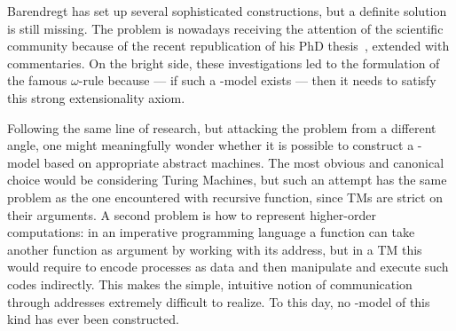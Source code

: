 Barendregt has set up several sophisticated constructions, but a definite solution is still missing.
The problem is nowadays receiving the attention of the scientific community because of the recent republication of his PhD thesis~\cite{BarendregtTh}, extended with commentaries.
On the bright side, these investigations led to the formulation of the famous $\omega$-rule because --- if such a \lam-model exists --- then it needs to satisfy this strong extensionality axiom.

Following the same line of research, but attacking the problem from a different angle, one might meaningfully wonder whether it is possible to construct a \lam-model based on appropriate abstract machines. The most obvious and canonical choice would be considering Turing Machines, but such an attempt has the same problem as the one encountered with recursive function, since TMs are strict on their arguments.
A second problem is how to represent higher-order computations: in an imperative programming language a function can take another function as argument by working with its address, but in a TM this would require to encode processes as data and then manipulate and execute such codes indirectly. This makes the simple, intuitive notion of communication through addresses  extremely difficult to realize.
To this day, no \lam-model of this kind has ever been constructed.

